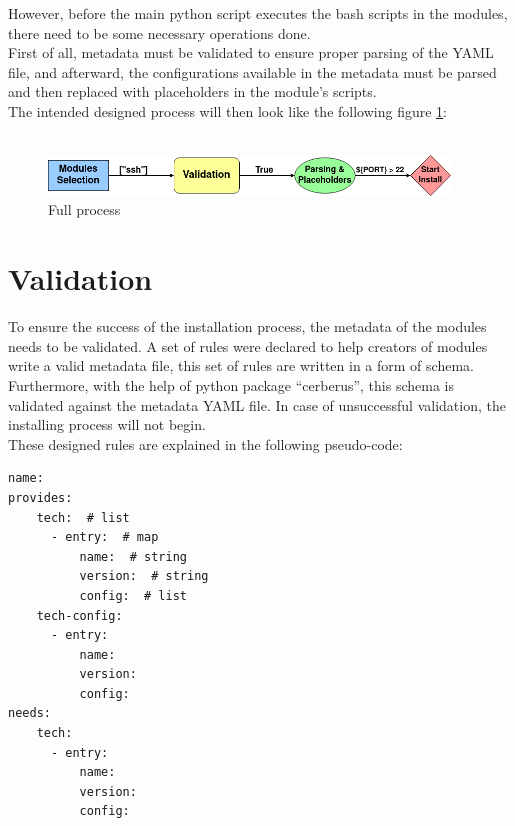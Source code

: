 However, before the main python script executes the bash scripts in the modules, there need to be some necessary operations done.\\
First of all, metadata must be validated to ensure proper parsing of the YAML file, and afterward, the configurations available in the metadata must be parsed and then replaced with placeholders in the module’s scripts.\\
The intended designed process will then look like the following figure \ref{fig:allprocess}:\\
\\

\begin{figure}[!ht]
\centering
\includegraphics[width=0.95\textwidth]{resources/figures/allprocess.png}
\caption{Full process}
\label{fig:allprocess}
\end{figure}

\clearpage

\section{Validation}
To ensure the success of the installation process, the metadata of the modules needs to be validated. A set of rules were declared to help creators of modules write a valid metadata file, this set of rules are written in a form of schema.\\
Furthermore, with the help of python package “cerberus”\cite{cerberus}, this schema is validated against the metadata YAML file. In case of unsuccessful validation, the installing process will not begin.\\
These designed rules are explained in the following pseudo-code:

\begin{lstlisting}[caption=YAML Schema, style=pythonstyle]
name:
provides:
    tech:  # list
      - entry:  # map
          name:  # string
          version:  # string
          config:  # list
    tech-config:
      - entry:
          name:
          version:
          config:
needs:
    tech:
      - entry:
          name:
          version:
          config:
\end{lstlisting}

